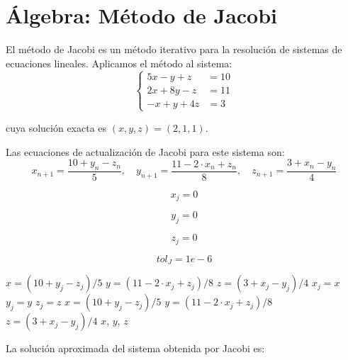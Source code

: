 \documentclass{article}
\begin{document}
\section{Álgebra: Método de Jacobi}

El método de Jacobi es un método iterativo para la resolución de sistemas de
ecuaciones lineales. Aplicamos el método al sistema:
\[
    \left \{
        \begin{array}{rr}
        5x-y+z & = 10 \\
        2x+8y-z & = 11 \\
        -x+y+4z & = 3
        \end{array}
    \right .
\]

cuya solución exacta es $(x, y, z) = (2,1,1)$.

Las ecuaciones de actualización de Jacobi para este sistema son:
\[
    x_{n+1} = \frac{10 + y_n - z_n}{5}, \quad y_{n+1} = \frac{11 - 2\cdot x_n + z_n}{8}, \quad z_{n+1} = \frac{3 + x_n - y_n}{4}
\]

\begin{equation}
    x_j = 0
    \label{eq:calc:xj}
\end{equation}

\begin{equation}
    y_j = 0
    \label{eq:calc:yj}
\end{equation}

\begin{equation}
    z_j = 0
    \label{eq:calc:zj}
\end{equation}

\begin{equation}
    tol_{J} = 1e-6
    \label{eq:calc:tolJ}
\end{equation}

\begin{algorithm}
\caption{Método de Jacobi para $5x-y+z = 10$, $2x+8y-z = 11$, $-x+y+4z = 3$}
\begin{algorithmic}
    \STATE $x = (10 + y_j - z_j)/5$
    \STATE $y = (11 - 2\cdot x_j + z_j)/8$
    \STATE $z = (3 + x_j - y_j)/4$
        \STATE $x_j = x$
        \STATE $y_j = y$
        \STATE $z_j = z$
        \STATE $x = (10 + y_j - z_j)/5$
        \STATE $y = (11 - 2\cdot x_j + z_j)/8$
        \STATE $z = (3 + x_j - y_j)/4$
    \ENDWHILE
    \RETURN $x$, $y$, $z$
\end{algorithmic}
\end{algorithm}

La solución aproximada del sistema obtenida por Jacobi es:
\end{document}
